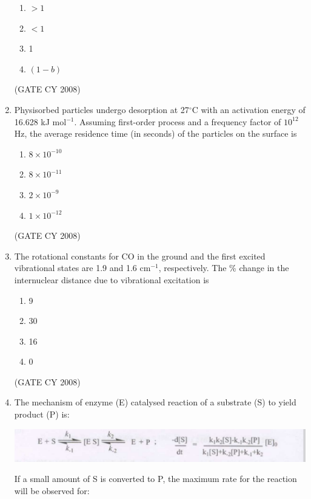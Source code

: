 \documentclass[12pt]{article}
\begin{document}
\begin{enumerate}
\begin{enumerate}
\item $> 1$
\item $< 1$
\item 1
\item $(1 - b)$
\end{enumerate}    \hfill{(GATE CY 2008)}




\item Physisorbed particles undergo desorption at 27$^\circ$C with an activation energy of 16.628 kJ mol$^{-1}$. Assuming first-order process and a frequency factor of $10^{12}$ Hz, the average residence time (in seconds) of the particles on the surface is

\begin{enumerate}
\item $8 \times 10^{-10}$
\item $8 \times 10^{-11}$
\item $2 \times 10^{-9}$
\item $1 \times 10^{-12}$
\end{enumerate}    \hfill{(GATE CY 2008)}




\item The rotational constants for CO in the ground and the first excited vibrational states are 1.9 and 1.6 cm$^{-1}$, respectively. The \% change in the internuclear distance due to vibrational excitation is

\begin{enumerate}
\item 9
\item 30
\item 16
\item 0
\end{enumerate}    \hfill{(GATE CY 2008)}




\item
The mechanism of enzyme (E) catalysed reaction of a substrate (S) to yield product (P) is:

\begin{center}
\includegraphics[width=0.6\columnwidth]{figs/q69.png}
\end{center}

If a small amount of S is converted to P, the maximum rate for the reaction will be observed for:


\end{enumerate}
\end{document}
